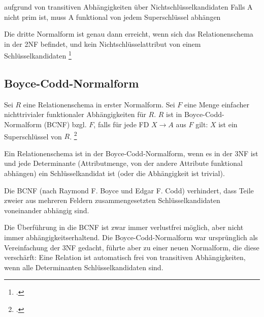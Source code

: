 \documentclass{lehramt-informatik-haupt}
\begin{document}
aufgrund von transitiven Abhängigkeiten über Nichtschlüsselkandidaten
Falls A nicht prim ist, muss A funktional von jedem Superschlüssel
abhängen

Die dritte Normalform ist genau dann erreicht, wenn sich das
Relationenschema in der 2NF befindet, und kein Nichtschlüsselattribut
von einem Schlüsselkandidaten \footcite[Dritte
Normalform (3NF)]{wiki:normalisierung}








%

\subsection{Boyce-Codd-Normalform}

Sei $R$ eine Relationenschema in erster Normalform. Sei $F$ eine Menge
einfacher nichttrivialer funktionaler Abhängigkeiten für $R$. $R$ ist in
Boyce-Codd-Normalform (BCNF) bzgl. $F$, falls für jede FD $X \rightarrow
A$ aus $F$ gilt: $X$ ist ein Superschlüssel von $R$.
\footcite[Boyce-Codd-Normalform (BCNF)]{wiki:normalisierung}

Ein Relationenschema ist in der Boyce-Codd-Normalform, wenn es in der
3NF ist und jede Determinante (Attributmenge, von der andere Attribute
funktional abhängen) ein Schlüsselkandidat ist (oder die Abhängigkeit
ist trivial).

Die BCNF (nach Raymond F. Boyce und Edgar F. Codd) verhindert, dass
Teile zweier aus mehreren Feldern zusammengesetzten Schlüsselkandidaten
voneinander abhängig sind.

Die Überführung in die BCNF ist zwar immer verlustfrei möglich, aber
nicht immer abhängigkeitserhaltend. Die Boyce-Codd-Normalform war
ursprünglich als Vereinfachung der 3NF gedacht, führte aber zu einer
neuen Normalform, die diese verschärft: Eine Relation ist automatisch
frei von transitiven Abhängigkeiten, wenn alle Determinanten
Schlüsselkandidaten sind.
\end{document}
